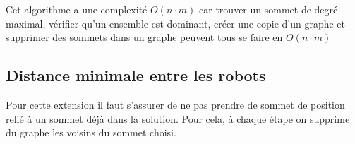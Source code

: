 
\vspace{2\baselineskip}

Cet algorithme a une complexité $O(n\cdot m)$ car trouver un sommet de degré maximal, vérifier qu'un ensemble est dominant, créer une copie d'un graphe et supprimer des sommets dans un graphe peuvent tous se faire en $O(n\cdot m)$

\subsection{Distance minimale entre les robots}
Pour cette extension il faut s'assurer de ne pas prendre de sommet de position relié à un sommet déjà dans la solution. Pour cela, à chaque étape on supprime du graphe les voisins du sommet choisi.\newline

